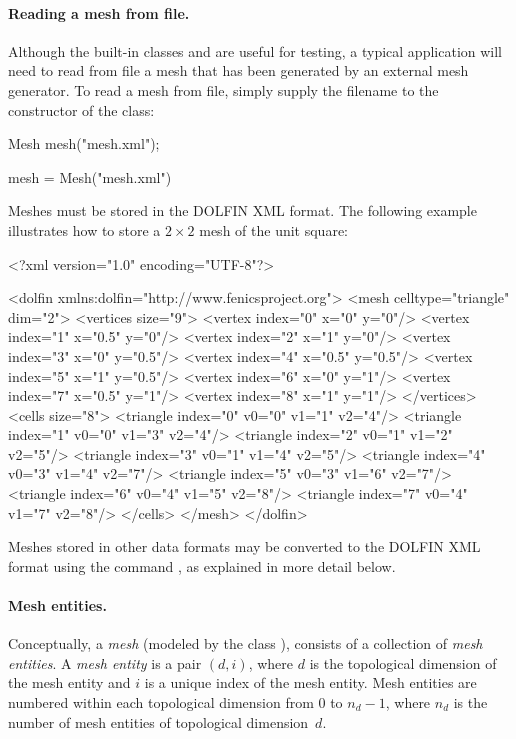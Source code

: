 \paragraph{Reading a mesh from file.}

Although the built-in classes  and 
are useful for testing, a typical application will need to read from
file a mesh that has been generated by an external mesh generator. To read
a mesh from file, simply supply the filename to the constructor of the
 class:
\begin{c++}
Mesh mesh("mesh.xml");
\end{c++}
\begin{python}
mesh = Mesh("mesh.xml")
\end{python}
Meshes must be stored in the DOLFIN XML format. The following example
illustrates how to store a $2 \times 2$ mesh of the unit square:

\begin{xml}
<?xml version="1.0" encoding="UTF-8"?>

<dolfin xmlns:dolfin="http://www.fenicsproject.org">
  <mesh celltype="triangle" dim="2">
    <vertices size="9">
      <vertex index="0" x="0" y="0"/>
      <vertex index="1" x="0.5" y="0"/>
      <vertex index="2" x="1" y="0"/>
      <vertex index="3" x="0" y="0.5"/>
      <vertex index="4" x="0.5" y="0.5"/>
      <vertex index="5" x="1" y="0.5"/>
      <vertex index="6" x="0" y="1"/>
      <vertex index="7" x="0.5" y="1"/>
      <vertex index="8" x="1" y="1"/>
    </vertices>
    <cells size="8">
      <triangle index="0" v0="0" v1="1" v2="4"/>
      <triangle index="1" v0="0" v1="3" v2="4"/>
      <triangle index="2" v0="1" v1="2" v2="5"/>
      <triangle index="3" v0="1" v1="4" v2="5"/>
      <triangle index="4" v0="3" v1="4" v2="7"/>
      <triangle index="5" v0="3" v1="6" v2="7"/>
      <triangle index="6" v0="4" v1="5" v2="8"/>
      <triangle index="7" v0="4" v1="7" v2="8"/>
    </cells>
  </mesh>
</dolfin>
\end{xml}
Meshes stored in other data formats may be converted to the DOLFIN XML
format using the command , as explained in more
detail below.

\paragraph{Mesh entities.}

Conceptually, a \emph{mesh} (modeled by the class ), consists of
a collection of \emph{mesh entities}.  A \emph{mesh entity} is a pair $(d,
i)$, where $d$ is the topological dimension of the mesh entity and $i$
is a unique index of the mesh entity. Mesh entities are numbered within
each topological dimension from $0$ to $n_d-1$, where $n_d$ is the number
of mesh entities of topological dimension~$d$.


